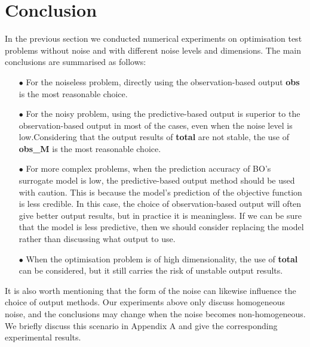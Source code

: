 \documentclass{article}
\begin{document}
\section{Conclusion}

\hspace{2em}In the previous section we conducted numerical experiments on optimisation test problems without noise and with different noise levels and dimensions. The main conclusions are summarised as follows: 


\begin{itemize}[itemsep=2pt,topsep=0pt,parsep=0pt]
    \item[$\bullet$] For the noiseless problem, directly using the observation-based output \textbf{obs} is the most reasonable choice. 
    \item[$\bullet$] For the noisy problem, using the predictive-based output is superior to the observation-based output in most of the cases, even when the noise level is low.Considering that the output results of \textbf{total} are not stable, the use of \textbf{obs\_M} is the most reasonable choice.
    \item[$\bullet$] For more complex problems, when the prediction accuracy of BO's surrogate model is low, the predictive-based output method should be used with caution. This is because the model's prediction of the objective function is less credible. In this case, the choice of observation-based output will often give better output results, but in practice it is meaningless. If we can be sure that the model is less predictive, then we should consider replacing the model rather than discussing what output to use.
    \item[$\bullet$] When the optimisation problem is of high dimensionality, the use of \textbf{total} can be considered, but it still carries the risk of unstable output results.  
       
    \end{itemize} 

\hspace{2em}It is also worth mentioning that the form of the noise can likewise influence the choice of output methods. Our experiments above only discuss homogeneous noise, and the conclusions may change when the noise becomes non-homogeneous. We briefly discuss this scenario in Appendix A and give the corresponding experimental results.



\clearpage


\end{document}
